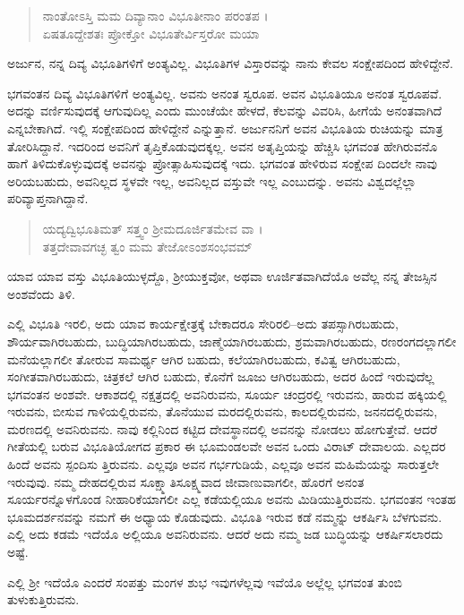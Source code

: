 \begin{verse}
ನಾಂತೋಽಸ್ತಿ ಮಮ ದಿವ್ಯಾನಾಂ ವಿಭೂತೀನಾಂ ಪರಂತಪ ।\\ಏಷತೂದ್ದೇಶತಃ ಪ್ರೋಕ್ತೋ ವಿಭೂತೇರ್ವಿಸ್ತರೋ ಮಯಾ 
\end{verse}

{\small ಅರ್ಜುನ, ನನ್ನ ದಿವ್ಯ ವಿಭೂತಿಗಳಿಗೆ ಅಂತ್ಯವಿಲ್ಲ. ವಿಭೂತಿಗಳ ವಿಸ್ತಾರವನ್ನು ನಾನು ಕೇವಲ ಸಂಕ್ಷೇಪದಿಂದ ಹೇಳಿದ್ದೇನೆ.}

ಭಗವಂತನ ದಿವ್ಯ ವಿಭೂತಿಗಳಿಗೆ ಅಂತ್ಯವಿಲ್ಲ. ಅವನು ಅನಂತ ಸ್ವರೂಪ. ಅವನ ವಿಭೂತಿಯೂ ಅನಂತ ಸ್ವರೂಪವೆ. ಅದನ್ನು ವರ್ಣಿಸುವುದಕ್ಕೆ ಆಗುವುದಿಲ್ಲ ಎಂದು ಮುಂಚೆಯೇ ಹೇಳದೆ, ಕೆಲವನ್ನು ವಿವರಿಸಿ, ಹೀಗೆಯೆ ಅನಂತವಾಗಿದೆ ಎನ್ನಬೇಕಾಗಿದೆ. ಇಲ್ಲಿ ಸಂಕ್ಷೇಪದಿಂದ ಹೇಳಿದ್ದೇನೆ ಎನ್ನುತ್ತಾನೆ. ಅರ್ಜುನನಿಗೆ ಅವನ ವಿಭೂತಿಯ ರುಚಿಯನ್ನು ಮಾತ್ರ ತೋರಿಸಿದ್ದಾನೆ. ಇದರಿಂದ ಅವನಿಗೆ ತೃಪ್ತಿಕೊಡುವುದಕ್ಕಲ್ಲ. ಅವನ ಅತೃಪ್ತಿಯನ್ನು ಹೆಚ್ಚಿಸಿ ಭಗವಂತ ಹೇಗಿರುವನೊ ಹಾಗೆ ತಿಳಿದುಕೊಳ್ಳುವುದಕ್ಕೆ ಅವನನ್ನು ಪ್ರೋತ್ಸಾಹಿಸುವುದಕ್ಕೆ ಇದು. ಭಗವಂತ ಹೇಳಿರುವ ಸಂಕ್ಷೇಪ ದಿಂದಲೇ ನಾವು ಅರಿಯಬಹುದು, ಅವನಿಲ್ಲದ ಸ್ಥಳವೇ ಇಲ್ಲ, ಅವನಿಲ್ಲದ ವಸ್ತುವೇ ಇಲ್ಲ ಎಂಬುದನ್ನು. ಅವನು ವಿಶ್ವದಲ್ಲೆಲ್ಲಾ ಪರಿವ್ಯಾಪ್ತನಾಗಿದ್ದಾನೆ.

\begin{verse}
ಯದ್ಯದ್ವಿಭೂತಿಮತ್ ಸತ್ತ್ವಂ ಶ್ರೀಮದೂರ್ಜಿತಮೇವ ವಾ ।\\ತತ್ತದೇವಾವಗಚ್ಛ ತ್ವಂ ಮಮ ತೇಜೋಽಂಶಸಂಭವಮ್ 
\end{verse}

{\small ಯಾವ ಯಾವ ವಸ್ತು ವಿಭೂತಿಯುಳ್ಳದ್ದೊ, ಶ್ರೀಯುಕ್ತವೋ, ಅಥವಾ ಊರ್ಜಿತವಾಗಿದೆಯೊ ಅವೆಲ್ಲ ನನ್ನ ತೇಜಸ್ಸಿನ ಅಂಶವೆಂದು ತಿಳಿ.}

ಎಲ್ಲಿ ವಿಭೂತಿ ಇರಲಿ, ಅದು ಯಾವ ಕಾರ್ಯಕ್ಷೇತ್ರಕ್ಕೆ ಬೇಕಾದರೂ ಸೇರಿರಲಿ–ಅದು ತಪಸ್ಸಾಗಿರಬಹುದು, ಶೌರ್ಯವಾಗಿರಬಹುದು, ಬುದ್ಧಿಯಾಗಿರಬಹುದು, ಜಾಣ್ಮೆಯಾಗಿರಬಹುದು, ಶ್ರಮವಾಗಿರಬಹುದು, ರಣರಂಗದಲ್ಲಾಗಲೀ ಮನೆಯಲ್ಲಾಗಲೀ ತೋರುವ ಸಾಮರ್ಥ್ಯ ಆಗಿರ ಬಹುದು, ಕಲೆಯಾಗಿರಬಹುದು, ಕವಿತ್ವ ಆಗಿರಬಹುದು, ಸಂಗೀತವಾಗಿರಬಹುದು, ಚಿತ್ರಕಲೆ ಆಗಿರ ಬಹುದು, ಕೊನೆಗೆ ಜೂಜು ಆಗಿರಬಹುದು, ಅದರ ಹಿಂದೆ ಇರುವುದೆಲ್ಲ ಭಗವಂತನ ಅಂಶವೇ. ಆಕಾಶದಲ್ಲಿ ನಕ್ಷತ್ರದಲ್ಲಿ ಅವನಿರುವನು, ಸೂರ್ಯ ಚಂದ್ರರಲ್ಲಿ ಇರುವನು, ಹಾರುವ ಹಕ್ಕಿಯಲ್ಲಿ ಇರುವನು, ಬೀಸುವ ಗಾಳಿಯಲ್ಲಿರುವನು, ತೊನೆಯುವ ಮರದಲ್ಲಿರುವನು, ಕಾಲದಲ್ಲಿರುವನು, ಜನನದಲ್ಲಿರುವನು, ಮರಣದಲ್ಲಿ ಅವನಿರುವನು. ನಾವು ಕಲ್ಲಿನಿಂದ ಕಟ್ಟಿದ ದೇವಸ್ಥಾನದಲ್ಲಿ ಅವನನ್ನು ನೋಡಲು ಹೋಗುತ್ತೇವೆ. ಆದರೆ ಗೀತೆಯಲ್ಲಿ ಬರುವ ವಿಭೂತಿಯೋಗದ ಪ್ರಕಾರ ಈ ಭೂಮಂಡಲವೇ ಅವನ ಒಂದು ವಿರಾಟ್ ದೇವಾಲಯ. ಎಲ್ಲದರ ಹಿಂದೆ ಅವನು ಸ್ಪಂದಿಸು ತ್ತಿರುವನು. ಎಲ್ಲವೂ ಅವನ ಗರ್ಭಗುಡಿಯೆ, ಎಲ್ಲವೂ ಅವನ ಮಹಿಮೆಯನ್ನು ಸಾರುತ್ತಲೇ ಇರುವುವು. ನಮ್ಮ ದೇಹದಲ್ಲಿರುವ ಸೂಕ್ಷ್ಮಾತಿಸೂಕ್ಷ್ಮವಾದ ಜೀವಾಣುವಾಗಲೀ, ಹೊರಗೆ ಅನಂತ ಸೂರ್ಯರನ್ನೊಳಗೊಂಡ ನೀಹಾರಿಕೆಯಾಗಲೀ ಎಲ್ಲ ಕಡೆಯಲ್ಲಿಯೂ ಅವನು ಮಿಡಿಯುತ್ತಿರುವನು. ಭಗವಂತನ ಇಂತಹ ಭೂಮದರ್ಶನವನ್ನು ನಮಗೆ ಈ ಅಧ್ಯಾಯ ಕೊಡುವುದು. ವಿಭೂತಿ ಇರುವ ಕಡೆ ನಮ್ಮನ್ನು ಆಕರ್ಷಿಸಿ ಬೆಳಗುವನು. ಎಲ್ಲಿ ಅದು ಕಡಮೆ ಇದೆಯೊ ಅಲ್ಲಿಯೂ ಅವನಿರುವನು. ಆದರೆ ಅದು ನಮ್ಮ ಜಡ ಬುದ್ಧಿಯನ್ನು ಆಕರ್ಷಿಸಲಾರದು ಅಷ್ಟೆ.

ಎಲ್ಲಿ ಶ್ರೀ ಇದೆಯೊ ಎಂದರೆ ಸಂಪತ್ತು ಮಂಗಳ ಶುಭ ಇವುಗಳೆಲ್ಲವು ಇವೆಯೊ ಅಲ್ಲೆಲ್ಲ ಭಗವಂತ ತುಂಬಿ ತುಳುಕುತ್ತಿರುವನು.

